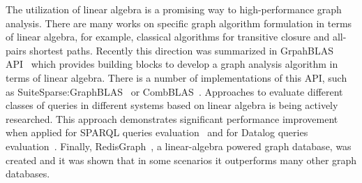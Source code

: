 The utilization of linear algebra is a promising way to high-performance graph analysis.
There are many works on specific graph algorithm formulation in terms of linear algebra, for example, classical algorithms for transitive closure and all-pairs shortest paths.
Recently this direction was summarized in GrpahBLAS API~\cite{7761646} which provides building blocks to develop a graph analysis algorithm in terms of linear algebra.
There is a number of implementations of this API, such as SuiteSparse:GraphBLAS~\cite{10.1145/3322125} or CombBLAS~\cite{10.1177/1094342011403516}.
Approaches to evaluate different classes of queries in different systems based on linear algebra is being actively researched.
This approach demonstrates significant performance improvement when applied for SPARQL queries evaluation~\cite{10.1145/3302424.3303962,DBLP:journals/corr/MetzlerM15a} and for Datalog queries evaluation~\cite{sato_2017}.
Finally, RedisGraph~\cite{8778293}, a linear-algebra powered graph database, was created and it was shown that in some scenarios it outperforms many other graph databases.